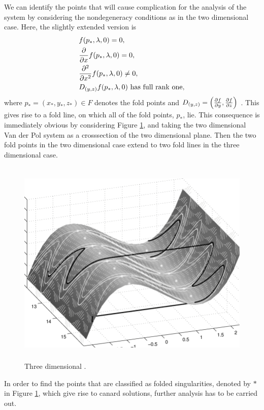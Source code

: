 We can identify the points that will cause complication for the analysis of the system by considering the nondegeneracy conditions as in the two dimensional case. Here, the slightly extended version is
\begin{equation}
\begin{aligned}
&f(p_*,\lambda,0)=0,\\
&\pd{}{x}f(p_*,\lambda,0)=0,\\
&\pd{^2}{x^2}f(p_*,\lambda,0)\neq 0,\\
&D_{(y,z)}f(p_*,\lambda,0) \ \text{has full rank one},
\end{aligned}
\label{eq: non-degeneracy 3d system}
\end{equation}
where $ p_*=(x_*,y_*,z_*)\in F $  denotes the fold points and $ D_{(y,z)}=\left(\pd{f}{y},\pd{f}{z}\right) $  \citep{MMO}.
This gives rise to a fold line, on which all of the fold points, $p_*$, lie.
This consequence is immediately obvious by considering Figure \ref{fig: 3d folded singularity}, and taking the two dimensional Van der Pol system as a crosssection of the two dimensional plane. Then the two fold points in the two dimensional case extend to two fold lines in the three dimensional case.
\begin{figure}[h!]\centering
	\includegraphics[height=10cm,width=14cm]{Images/Three-dimensional-plot-of-a-trajectory-for-the-van-der-Pol-equation-and-the-critical}
	\caption{Three dimensional \vdp \citep{3D-VdP}.}
	\label{fig: 3d folded singularity}
\end{figure}\newpage
In order to find the points that are classified as folded singularities, denoted by $*$ in Figure \ref{fig: 3d folded singularity}, which give rise to canard solutions, further analysis has to be carried out.
